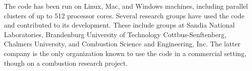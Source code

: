 \documentclass[preprint,12pt, a4paper]{elsarticle}
\begin{document}
The code has been run on Linux, Mac, and Windows machines, including parallel clusters of up to 512 processor cores. Several research groups have used the code and contributed to its development. These include groups at Sandia National Laboratories, Brandenburg University of Technology Cottbus-Senftenberg, Chalmers University, and Combustion Science and Engineering, Inc. The latter company is the only organization known to use the code in a commercial setting, though on a combustion research project. 

\end{document}
